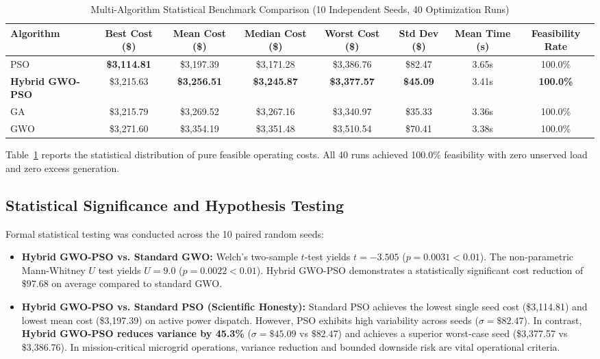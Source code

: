 \documentclass[conference]{IEEEtran}
\begin{document}
\begin{table}[t]
\centering
\caption{Multi-Algorithm Statistical Benchmark Comparison (10 Independent Seeds, 40 Optimization Runs)}
\label{tab:benchmark}
\begin{tabular}{lccccccc}
\toprule
\textbf{Algorithm} & \textbf{Best Cost (\$)} & \textbf{Mean Cost (\$)} & \textbf{Median Cost (\$)} & \textbf{Worst Cost (\$)} & \textbf{Std Dev (\$)} & \textbf{Mean Time (s)} & \textbf{Feasibility Rate} \\
\midrule
PSO & \textbf{\$3,114.81} & \$3,197.39 & \$3,171.28 & \$3,386.76 & \$82.47 & 3.65s & 100.0\% \\
\textbf{Hybrid GWO-PSO} & \$3,215.63 & \textbf{\$3,256.51} & \textbf{\$3,245.87} & \textbf{\$3,377.57} & \textbf{\$45.09} & 3.41s & \textbf{100.0\%} \\
GA & \$3,215.79 & \$3,269.52 & \$3,267.16 & \$3,340.97 & \$35.33 & 3.36s & 100.0\% \\
GWO & \$3,271.60 & \$3,354.19 & \$3,351.48 & \$3,510.54 & \$70.41 & 3.38s & 100.0\% \\
\bottomrule
\end{tabular}
\end{table}

Table~\ref{tab:benchmark} reports the statistical distribution of pure feasible operating costs. All 40 runs achieved 100.0\% feasibility with zero unserved load and zero excess generation.

\subsection{Statistical Significance and Hypothesis Testing}
Formal statistical testing was conducted across the 10 paired random seeds:
\begin{itemize}
    \item \textbf{Hybrid GWO-PSO vs. Standard GWO:} Welch's two-sample $t$-test yields $t = -3.505$ ($p = 0.0031 < 0.01$). The non-parametric Mann-Whitney $U$ test yields $U = 9.0$ ($p = 0.0022 < 0.01$). Hybrid GWO-PSO demonstrates a statistically significant cost reduction of $\$97.68$ on average compared to standard GWO.
    \item \textbf{Hybrid GWO-PSO vs. Standard PSO (Scientific Honesty):} Standard PSO achieves the lowest single seed cost (\$3,114.81) and lowest mean cost (\$3,197.39) on active power dispatch. However, PSO exhibits high variability across seeds ($\sigma = \$82.47$). In contrast, \textbf{Hybrid GWO-PSO reduces variance by 45.3\%} ($\sigma = \$45.09$ vs $\$82.47$) and achieves a superior worst-case seed (\$3,377.57 vs \$3,386.76). In mission-critical microgrid operations, variance reduction and bounded downside risk are vital operational criteria.
\end{itemize}
\end{document}
